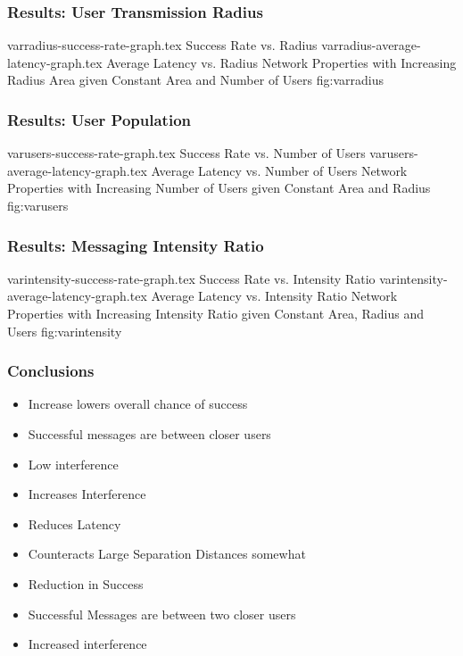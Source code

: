 \begin{frame}
    \frametitle{Results: User Transmission Radius}
\sidebysidefigures
{varradius-success-rate-graph.tex}     {Success Rate vs. Radius}
{varradius-average-latency-graph.tex}  {Average Latency vs. Radius}
{Network Properties with Increasing Radius Area given Constant Area and Number of Users}
{fig:varradius}

\end{frame}

\begin{frame}
    \frametitle{Results: User Population}
\sidebysidefigures
{varusers-success-rate-graph.tex}      {Success Rate vs. Number of Users}
{varusers-average-latency-graph.tex}   {Average Latency vs. Number of Users}
{Network Properties with Increasing Number of Users given Constant Area and Radius}
{fig:varusers}

\end{frame}

\begin{frame}
    \frametitle{Results: Messaging Intensity Ratio}
\sidebysidefigures
{varintensity-success-rate-graph.tex}      {Success Rate vs. Intensity Ratio}
{varintensity-average-latency-graph.tex}   {Average Latency vs. Intensity Ratio}
{Network Properties with Increasing Intensity Ratio given Constant Area, Radius and Users}
{fig:varintensity}

\end{frame}

\begin{frame}
    \frametitle{Conclusions}

    \begin{itemize}
        \item Increase lowers overall chance of success
        \item Successful messages are between closer users
        \item Low interference\\[0.5cm]
    \end{itemize}
    
    \begin{itemize}
        \item Increases Interference
        \item Reduces Latency
        \item Counteracts Large Separation Distances somewhat\\[0.5cm]
    \end{itemize}
    
    \begin{itemize}
        \item Reduction in Success
        \item Successful Messages are between two closer users
        \item Increased interference
    \end{itemize}

\end{frame}

